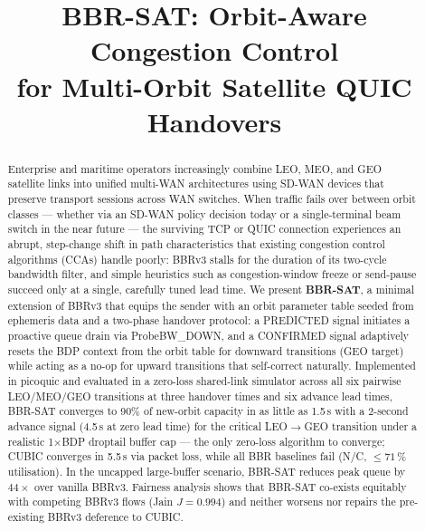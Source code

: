 \documentclass[conference]{IEEEtran}
\begin{document}
\title{BBR-SAT: Orbit-Aware Congestion Control\\
       for Multi-Orbit Satellite QUIC Handovers}

\author{
}

\maketitle

\begin{abstract}
Enterprise and maritime operators increasingly combine LEO, MEO, and GEO
satellite links into unified multi-WAN architectures using SD-WAN devices
that preserve transport sessions across WAN switches.
When traffic fails over between orbit classes --- whether via an SD-WAN
policy decision today or a single-terminal beam switch in the near future
--- the surviving TCP or QUIC connection experiences an abrupt, step-change
shift in path characteristics that existing congestion control algorithms
(CCAs) handle poorly:
BBRv3 stalls for the duration of its two-cycle bandwidth filter, and
simple heuristics such as congestion-window freeze or send-pause succeed
only at a single, carefully tuned lead time.
We present \textbf{BBR-SAT}, a minimal extension of BBRv3 that equips the
sender with an orbit parameter table seeded from ephemeris data and a
two-phase handover protocol: a PREDICTED signal initiates a proactive queue
drain via ProbeBW\_DOWN, and a CONFIRMED signal adaptively resets the BDP
context from the orbit table for downward transitions (GEO target) while
acting as a no-op for upward transitions that self-correct naturally.
Implemented in picoquic and evaluated in a zero-loss shared-link simulator
across all six pairwise LEO/MEO/GEO transitions at three handover times and
six advance lead times, BBR-SAT converges to 90\% of new-orbit capacity
in as little as 1.5\,s with a 2-second advance signal (4.5\,s at zero lead
time) for the critical LEO$\to$GEO transition under a realistic 1$\times$BDP
droptail buffer cap --- the only zero-loss algorithm to converge;
CUBIC converges in 5.5\,s via packet loss, while all BBR baselines fail
(N/C, ${\leq}71$\,\% utilisation).
In the uncapped large-buffer scenario, BBR-SAT reduces peak queue by
$44\times$ over vanilla BBRv3.
Fairness analysis shows that BBR-SAT co-exists equitably with competing
BBRv3 flows (Jain $J = 0.994$) and neither worsens nor repairs the
pre-existing BBRv3 deference to CUBIC.
\end{abstract}
\end{document}

